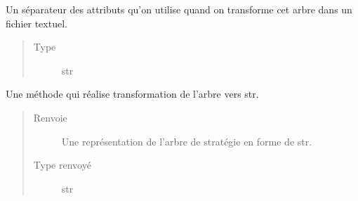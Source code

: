 \documentclass[letterpaper,10pt,french]{sphinxmanual}
\begin{document}
\begin{fulllineitems}
\begin{fulllineitems}
\begin{quote}
\begin{description}
\end{description}\end{quote}

\end{fulllineitems}


\begin{fulllineitems}
\label{\detokenize{index:StrategyTree.StrategyTree.fout_sep}}
Un séparateur des attributs qu’on utilise quand on transforme cet arbre dans un fichier textuel.
\begin{quote}\begin{description}
\item[{Type}] \leavevmode
str

\end{description}\end{quote}

\end{fulllineitems}


\begin{fulllineitems}
\label{\detokenize{index:StrategyTree.StrategyTree.__str__}}
Une méthode qui réalise transformation de l’arbre vers str.
\begin{quote}\begin{description}
\item[{Renvoie}] \leavevmode
{} \textendash{} Une représentation de l’arbre de stratégie en forme de str.

\item[{Type renvoyé}] \leavevmode
str

\end{description}\end{quote}

\end{fulllineitems}



\end{fulllineitems}
\end{document}
